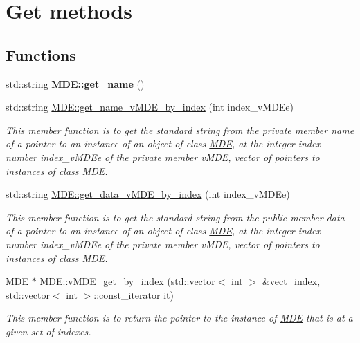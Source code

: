 \hypertarget{group__group__get}{}\section{Get methods}
\label{group__group__get}
\subsection*{Functions}
\begin{DoxyCompactItemize}
\item 
std\+::string {\bfseries M\+D\+E\+::get\+\_\+name} ()\hypertarget{group__group__get_ga2e18a8531fd1dd5884ebf03747656f04}{}\label{group__group__get_ga2e18a8531fd1dd5884ebf03747656f04}

\item 
std\+::string \hyperlink{group__group__get_ga8bb6595c805411ef0c044763a1a3310a}{M\+D\+E\+::get\+\_\+name\+\_\+v\+M\+D\+E\+\_\+by\+\_\+index} (int index\+\_\+v\+M\+D\+Ee)
\begin{DoxyCompactList}\small\item\em This member function is to get the standard string from the private member \textquotesingle{}name\textquotesingle{} of a pointer to an instance of an object of class \hyperlink{classMDE}{M\+DE}, at the integer index number index\+\_\+v\+M\+D\+Ee of the private member v\+M\+DE, vector of pointers to instances of class \hyperlink{classMDE}{M\+DE}. \end{DoxyCompactList}\item 
std\+::string \hyperlink{group__group__get_ga4ceb5c957197f9a85998d111d2308452}{M\+D\+E\+::get\+\_\+data\+\_\+v\+M\+D\+E\+\_\+by\+\_\+index} (int index\+\_\+v\+M\+D\+Ee)
\begin{DoxyCompactList}\small\item\em This member function is to get the standard string from the public member \textquotesingle{}data\textquotesingle{} of a pointer to an instance of an object of class \hyperlink{classMDE}{M\+DE}, at the integer index number index\+\_\+v\+M\+D\+Ee of the private member v\+M\+DE, vector of pointers to instances of class \hyperlink{classMDE}{M\+DE}. \end{DoxyCompactList}\item 
\hyperlink{classMDE}{M\+DE} $\ast$ \hyperlink{group__group__get_gab0c2bc0e33b0b3c651e56141cefc2f8b}{M\+D\+E\+::v\+M\+D\+E\+\_\+get\+\_\+by\+\_\+index} (std\+::vector$<$ int $>$ \&vect\+\_\+index, std\+::vector$<$ int $>$\+::const\+\_\+iterator it)
\begin{DoxyCompactList}\small\item\em This member function is to return the pointer to the instance of \hyperlink{classMDE}{M\+DE} that is at a given set of indexes. \end{DoxyCompactList}\end{DoxyCompactItemize}


